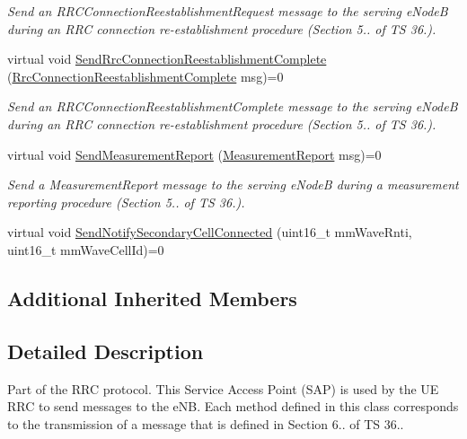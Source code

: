 \begin{DoxyCompactItemize}
\begin{DoxyCompactList}\small\item\em Send an {\itshape R\+R\+C\+Connection\+Reestablishment\+Request} message to the serving e\+NodeB during an R\+RC connection re-\/establishment procedure (Section 5.. of TS 36.). \end{DoxyCompactList}\item 
virtual void \hyperlink{classns3_1_1LteUeRrcSapUser_a3019e93ec5a719da6a9b2eca8062a565}{Send\+Rrc\+Connection\+Reestablishment\+Complete} (\hyperlink{structns3_1_1LteRrcSap_1_1RrcConnectionReestablishmentComplete}{Rrc\+Connection\+Reestablishment\+Complete} msg)=0
\begin{DoxyCompactList}\small\item\em Send an {\itshape R\+R\+C\+Connection\+Reestablishment\+Complete} message to the serving e\+NodeB during an R\+RC connection re-\/establishment procedure (Section 5.. of TS 36.). \end{DoxyCompactList}\item 
virtual void \hyperlink{classns3_1_1LteUeRrcSapUser_a48beb3096e6db00ed9c0a525672e6bad}{Send\+Measurement\+Report} (\hyperlink{structns3_1_1LteRrcSap_1_1MeasurementReport}{Measurement\+Report} msg)=0
\begin{DoxyCompactList}\small\item\em Send a {\itshape Measurement\+Report} message to the serving e\+NodeB during a measurement reporting procedure (Section 5.. of TS 36.). \end{DoxyCompactList}\item 
virtual void \hyperlink{classns3_1_1LteUeRrcSapUser_af5a1fc6c9cce6af8ae3a4906a09c19d8}{Send\+Notify\+Secondary\+Cell\+Connected} (uint16\+\_\+t mm\+Wave\+Rnti, uint16\+\_\+t mm\+Wave\+Cell\+Id)=0
\end{DoxyCompactItemize}
\subsection*{Additional Inherited Members}


\subsection{Detailed Description}
Part of the R\+RC protocol. This Service Access Point (S\+AP) is used by the UE R\+RC to send messages to the e\+NB. Each method defined in this class corresponds to the transmission of a message that is defined in Section 6.. of TS 36.. 


